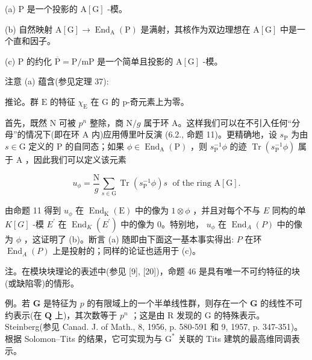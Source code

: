 \documentclass[10pt]{article}
\begin{document}
(a) \(\mathrm{P}\) 是一个投影的 \(\mathrm{A}\left\lbrack  \mathrm{G}\right\rbrack\) -模。

(b) 自然映射 \(\mathrm{A}\left\lbrack  \mathrm{G}\right\rbrack   \rightarrow  {\operatorname{End}}_{\mathrm{A}}\left( \mathrm{P}\right)\) 是满射，其核作为双边理想在 \(\mathrm{A}\left\lbrack  \mathrm{G}\right\rbrack\) 中是一个直和因子。

(c) \(\mathrm{P}\) 的约化 \(\overline{\mathrm{P}} = \mathrm{P}/\mathrm{{mP}}\) 是一个简单且投影的 \(\mathrm{A}\left\lbrack  \mathrm{G}\right\rbrack\) -模。

注意 (a) 蕴含(参见定理 37):

推论。群 \(\mathrm{E}\) 的特征 \({\chi }_{\mathrm{E}}\) 在 \(\mathrm{G}\) 的 p-奇元素上为零。

首先，既然 \(\mathrm{N}\) 可被 \({p}^{n}\) 整除，商 \(\mathrm{N}/g\) 属于环 A。这样我们可以在不引入任何“分母”的情况下(即在环 A 内)应用傅里叶反演 (6.2., 命题 11)。更精确地，设 \({s}_{\mathrm{P}}\) 为由 \(s \in  \mathrm{G}\) 定义的 \(\mathrm{P}\) 的自同态；如果 \(\phi  \in  {\operatorname{End}}_{\mathrm{A}}\left( \mathrm{P}\right)\) ，则 \({s}_{\mathrm{P}}^{-1}\phi\) 的迹 \(\operatorname{Tr}\left( {{s}_{\mathrm{P}}^{-1}\phi }\right)\) 属于 \(\mathrm{A}\) ，因此我们可以定义该元素

\[
{u}_{\phi } = \frac{\mathrm{N}}{g}\mathop{\sum }\limits_{{s \in  \mathrm{G}}}\operatorname{Tr}\left( {{s}_{\mathrm{P}}^{-1}\phi }\right) s\;\text{ of the ring }\mathrm{A}\left\lbrack  \mathrm{G}\right\rbrack  .
\]

由命题 11 得到 \({u}_{\phi }\) 在 \({\operatorname{End}}_{\mathrm{K}}\left( \mathrm{E}\right)\) 中的像为 \(1 \otimes  \phi\) ，并且对每个不与 \(E\) 同构的单 \(K\left\lbrack  G\right\rbrack\) -模 \({E}^{\prime }\) 在 \({\operatorname{End}}_{K}\left( {E}^{\prime }\right)\) 中的像为 0。特别地， \({u}_{\phi }\) 在 \({\operatorname{End}}_{A}\left( P\right)\) 中的像为 \(\phi\) ，这证明了 (b)。断言 (a) 随即由下面这一基本事实得出: \(P\) 在环 \({\operatorname{End}}_{A}\left( P\right)\) 上是投射的；同样的论证也适用于 (c)。

注。在模块块理论的表述中(参见 [9], [20])，命题 46 是具有唯一不可约特征的块(或缺陷零)的情形。

例。若 \(\mathbf{G}\) 是特征为 \(p\) 的有限域上的一个半单线性群，则存在一个 \(\mathbf{G}\) 的线性不可约表示(在 \(\mathbf{Q}\) 上)，其次数等于 \({p}^{n}\) ；这是由 \(\mathrm{R}\) 发现的 \(\mathrm{G}\) 的特殊表示。Steinberg(参见 Canad. J. of Math., 8, 1956, p. 580-591 和 9, 1957, p. 347-351)。根据 Solomon–Tits 的结果，它可实现为与 \({\mathrm{G}}^{ * }\) 关联的 Tits 建筑的最高维同调表示。
\end{document}
